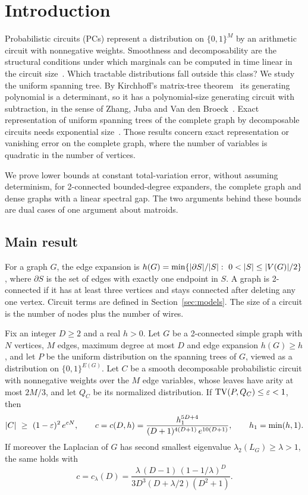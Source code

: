 \section{Introduction}\label{sec:intro}

Probabilistic circuits (PCs) represent a distribution on $\{0,1\}^M$ by an arithmetic circuit with nonnegative weights. Smoothness and decomposability are the structural conditions under which marginals can be computed in time linear in the circuit size~\cite{ChoiVergariVdB20}. Which tractable distributions fall outside this class? We study the uniform spanning tree. By Kirchhoff's matrix-tree theorem~\cite{Kirchhoff1847} its generating polynomial is a determinant, so it has a polynomial-size generating circuit with subtraction, in the sense of Zhang, Juba and Van den Broeck~\cite{ZhangJubaVdB21}. Exact representation of uniform spanning trees of the complete graph by decomposable circuits needs exponential size~\cite{MartensMedabalimi14,ZhangHoltzenVdB20}. Those results concern exact representation or vanishing error on the complete graph, where the number of variables is quadratic in the number of vertices.

We prove lower bounds at constant total-variation error, without assuming determinism, for 2-connected bounded-degree expanders, the complete graph and dense graphs with a linear spectral gap. The two arguments behind these bounds are dual cases of one argument about matroids.

\subsection{Main result}

For a graph $G$, the edge expansion is $h(G)=\min\{\lvert \partial S\rvert/\lvert S\rvert:\ 0<\lvert S\rvert\le\lvert V(G)\rvert/2\}$, where $\partial S$ is the set of edges with exactly one endpoint in $S$. A graph is 2-connected if it has at least three vertices and stays connected after deleting any one vertex. Circuit terms are defined in Section~\ref{sec:models}. The size of a circuit is the number of nodes plus the number of wires.

\begin{theorem}\label{thm:main}
Fix an integer $D\ge2$ and a real $h>0$. Let $G$ be a 2-connected simple graph with $N$ vertices, $M$ edges, maximum degree at most $D$ and edge expansion $h(G)\ge h$, and let $P$ be the uniform distribution on the spanning trees of $G$, viewed as a distribution on $\{0,1\}^{E(G)}$. Let $C$ be a smooth decomposable probabilistic circuit with nonnegative weights over the $M$ edge variables, whose leaves have arity at most $2M/3$, and let $Q_C$ be its normalized distribution. If $\mathrm{TV}(P,Q_C)\le\varepsilon<1$, then
\[
  \lvert C\rvert\ \ge\ (1-\varepsilon)^2\,e^{c N},\qquad
  c=c(D,h)=\frac{h_1^{5D+4}}{(D+1)^{4(D+1)}\,e^{10(D+1)}},\qquad h_1=\min(h,1).
\]
If moreover the Laplacian of $G$ has second smallest eigenvalue $\lambda_2(L_G)\ge\lambda>1$, the same holds with
\[
  c=c_\lambda(D)=\frac{\lambda\,(D-1)\,(1-1/\lambda)^D}{3D^3(D+\lambda/2)(D^2+1)} .
\]
\end{theorem}

